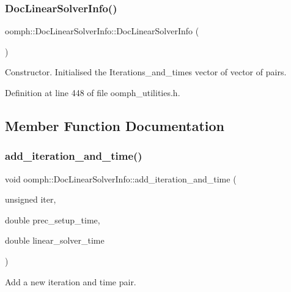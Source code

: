 \subsubsection{\texorpdfstring{Doc\+Linear\+Solver\+Info()}{DocLinearSolverInfo()}}
{\footnotesize\ttfamily oomph\+::\+Doc\+Linear\+Solver\+Info\+::\+Doc\+Linear\+Solver\+Info (\begin{DoxyParamCaption}{ }\end{DoxyParamCaption})\hspace{0.3cm}{\ttfamily [inline]}}



Constructor. Initialised the Iterations\+\_\+and\+\_\+times vector of vector of pairs. 



Definition at line 448 of file oomph\+\_\+utilities.\+h.



\subsection{Member Function Documentation}
\mbox{\label{classoomph_1_1DocLinearSolverInfo_abc5d49fefeb08d33960af0ec729bea80}} 
\subsubsection{\texorpdfstring{add\+\_\+iteration\+\_\+and\+\_\+time()}{add\_iteration\_and\_time()}}
{\footnotesize\ttfamily void oomph\+::\+Doc\+Linear\+Solver\+Info\+::add\+\_\+iteration\+\_\+and\+\_\+time (\begin{DoxyParamCaption}\item[{unsigned}]{iter,  }\item[{double}]{prec\+\_\+setup\+\_\+time,  }\item[{double}]{linear\+\_\+solver\+\_\+time }\end{DoxyParamCaption})\hspace{0.3cm}{\ttfamily [inline]}}



Add a new iteration and time pair. 



